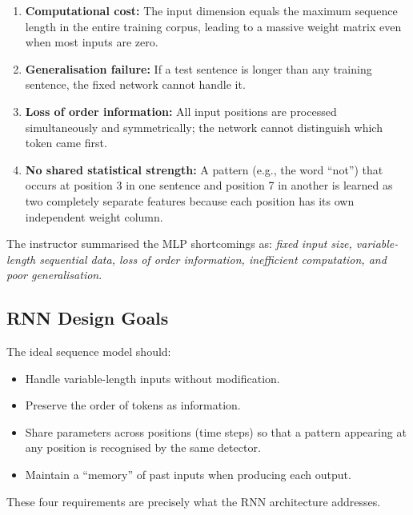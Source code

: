 \documentclass[12pt,a4paper]{article}
\begin{document}
\begin{warningbox}[title=Problems with Zero Padding in MLPs]
\begin{enumerate}[label=\arabic*., noitemsep]
  \item \textbf{Computational cost:} The input dimension equals the maximum
        sequence length in the entire training corpus, leading to a massive
        weight matrix even when most inputs are zero.
  \item \textbf{Generalisation failure:} If a test sentence is longer than any
        training sentence, the fixed network cannot handle it.
  \item \textbf{Loss of order information:} All input positions are processed
        simultaneously and symmetrically; the network cannot distinguish which
        token came first.
  \item \textbf{No shared statistical strength:} A pattern (e.g., the word
        ``not'') that occurs at position 3 in one sentence and position 7 in
        another is learned as two completely separate features because each
        position has its own independent weight column.
\end{enumerate}
\end{warningbox}

The instructor summarised the MLP shortcomings as: \emph{fixed input size,
variable-length sequential data, loss of order information, inefficient
computation, and poor generalisation}.

\subsection{RNN Design Goals}
\label{subsec:rnn_goals}

The ideal sequence model should:

\begin{itemize}[noitemsep]
  \item Handle variable-length inputs without modification.
  \item Preserve the order of tokens as information.
  \item Share parameters across positions (time steps) so that a pattern
        appearing at any position is recognised by the same detector.
  \item Maintain a ``memory'' of past inputs when producing each output.
\end{itemize}

These four requirements are precisely what the RNN architecture addresses.
\end{document}
